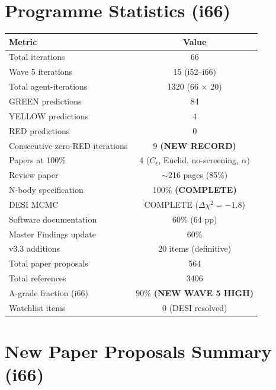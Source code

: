 \documentclass[11pt,a4paper]{article}
\begin{document}
\section{Programme Statistics (i66)}
\label{sec:stats}

\begin{center}
\begin{tabular}{lc}
\toprule
\textbf{Metric} & \textbf{Value} \\
\midrule
Total iterations & 66 \\
Wave 5 iterations & 15 (i52--i66) \\
Total agent-iterations & 1320 (66 $\times$ 20) \\
GREEN predictions & 84 \\
YELLOW predictions & 4 \\
RED predictions & 0 \\
Consecutive zero-RED iterations & 9 \textbf{(NEW RECORD)} \\
Papers at 100\% & 4 ($C_\ell$, Euclid, no-screening, $\alpha$) \\
Review paper & $\sim$216 pages (85\%) \\
N-body specification & 100\% \textbf{(COMPLETE)} \\
DESI MCMC & COMPLETE ($\Delta\chi^2 = -1.8$) \\
Software documentation & 60\% (64 pp) \\
Master Findings update & 60\% \\
v3.3 additions & 20 items (definitive) \\
Total paper proposals & 564 \\
Total references & 3406 \\
A-grade fraction (i66) & 90\% \textbf{(NEW WAVE 5 HIGH)} \\
Watchlist items & 0 (DESI resolved) \\
\bottomrule
\end{tabular}
\end{center}


\section{New Paper Proposals Summary (i66)}
\label{sec:papers}
\end{document}
